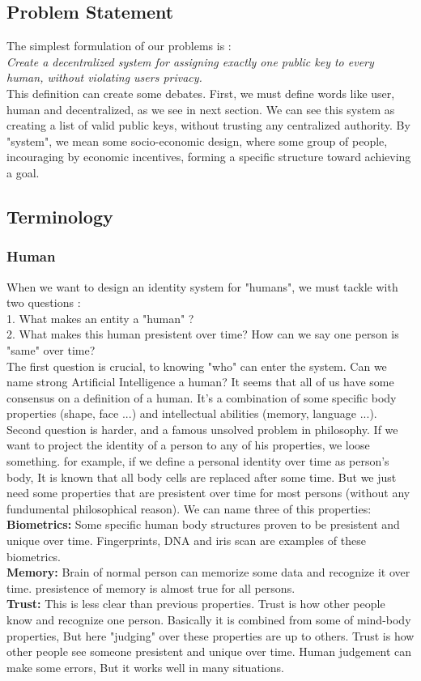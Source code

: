 \documentclass{article}
\begin{document}
\subsection{Problem Statement}
The simplest formulation of our problems is : \\
\textit{Create a decentralized system for assigning exactly one public key to every human, without violating users privacy. }
\\
This definition can create some debates. First, we must define words like user, human and decentralized, as we see in next section. We can see this system as creating a list of valid public keys, without trusting any centralized authority. By "system", we mean some socio-economic design, where some group of people, incouraging by economic incentives, forming a specific structure toward achieving a goal. 

\subsection{Terminology}

\subsubsection{Human}
When we want to design an identity system for "humans", we must tackle with two questions :
\\
1. What makes an entity a "human" ?
\\
2. What makes this human presistent over time? How  can we say one person is "same" over time?
\\
The first question is crucial, to knowing "who" can enter the system. Can we name strong Artificial Intelligence a human? It seems that all of us have some consensus on a definition of a human. It's a combination of some specific body properties (shape, face ...) and intellectual abilities (memory, language ...). 
\\
Second question is harder, and a famous unsolved problem in philosophy. If we want to project the identity of a person to any of his properties, we loose something. for example, if we define a personal identity over time as person's body, It is known that all body cells are replaced after some time. But we just need some properties that are presistent over time for most persons (without any fundumental philosophical reason). We can name three of this properties: 
\\
\textbf{Biometrics:} Some specific human body structures proven to be presistent and unique over time. Fingerprints, DNA and iris scan are examples of these biometrics.
\\
\textbf{Memory:} Brain of normal person can memorize some data and recognize it over time. presistence of memory is almost true for all persons.
\\
\textbf{Trust:} This is less clear than previous properties. Trust is how other people know and recognize one person. Basically it is combined from some of mind-body properties, But here "judging" over these properties are up to others. Trust is how other people see someone presistent and unique over time. Human judgement can make some errors, But it works well in many situations.
\end{document}
